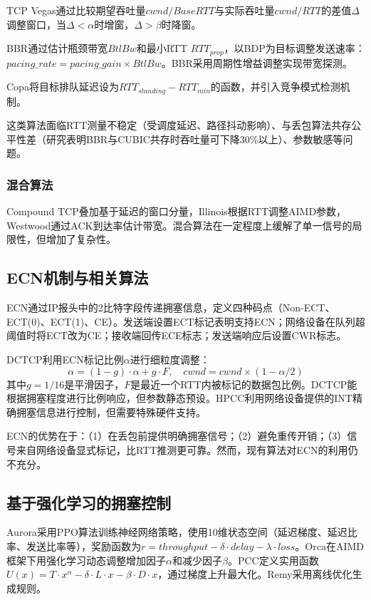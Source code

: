 \documentclass[10pt,twocolumn]{article}
\begin{document}
TCP Vegas\cite{vegas}通过比较期望吞吐量$cwnd/BaseRTT$与实际吞吐量$cwnd/RTT$的差值$\Delta$调整窗口，当$\Delta < \alpha$时增窗，$\Delta > \beta$时降窗。

BBR\cite{bbr}通过估计瓶颈带宽$BtlBw$和最小RTT $RTT_{prop}$，以BDP为目标调整发送速率：$pacing\_rate = pacing\_gain \times BtlBw$。BBR采用周期性增益调整实现带宽探测。

Copa\cite{copa}将目标排队延迟设为$RTT_{standing} - RTT_{min}$的函数，并引入竞争模式检测机制。

这类算法面临RTT测量不稳定（受调度延迟、路径抖动影响）、与丢包算法共存公平性差（研究表明BBR与CUBIC共存时吞吐量可下降30\%以上\cite{bbrfairness}）、参数敏感等问题。

\subsubsection{混合算法}

Compound TCP\cite{compound}叠加基于延迟的窗口分量，Illinois\cite{illinois}根据RTT调整AIMD参数，Westwood\cite{westwood}通过ACK到达率估计带宽。混合算法在一定程度上缓解了单一信号的局限性，但增加了复杂性。

\subsection{ECN机制与相关算法}

ECN\cite{rfc3168}通过IP报头中的2比特字段传递拥塞信息，定义四种码点（Non-ECT、ECT(0)、ECT(1)、CE）。发送端设置ECT标记表明支持ECN；网络设备在队列超阈值时将ECT改为CE；接收端回传ECE标志；发送端响应后设置CWR标志。

DCTCP\cite{dctcp}利用ECN标记比例$\alpha$进行细粒度调整：
\begin{equation}
\alpha = (1-g) \cdot \alpha + g \cdot F, \quad cwnd = cwnd \times (1 - \alpha/2)
\end{equation}
其中$g=1/16$是平滑因子，$F$是最近一个RTT内被标记的数据包比例。DCTCP能根据拥塞程度进行比例响应，但参数静态预设。HPCC\cite{hpcc}利用网络设备提供的INT精确拥塞信息进行控制，但需要特殊硬件支持。

ECN的优势在于：（1）在丢包前提供明确拥塞信号；（2）避免重传开销；（3）信号来自网络设备显式标记，比RTT推测更可靠。然而，现有算法对ECN的利用仍不充分。

\subsection{基于强化学习的拥塞控制}

Aurora\cite{aurora}采用PPO算法训练神经网络策略，使用10维状态空间（延迟梯度、延迟比率、发送比率等），奖励函数为$r = throughput - \delta \cdot delay - \lambda \cdot loss$。Orca\cite{orca}在AIMD框架下用强化学习动态调整增加因子$\alpha$和减少因子$\beta$。PCC\cite{pcc}定义实用函数$U(x) = T \cdot x^\alpha - \delta \cdot L \cdot x - \beta \cdot D \cdot x$，通过梯度上升最大化。Remy\cite{remy}采用离线优化生成规则。
\end{document}

